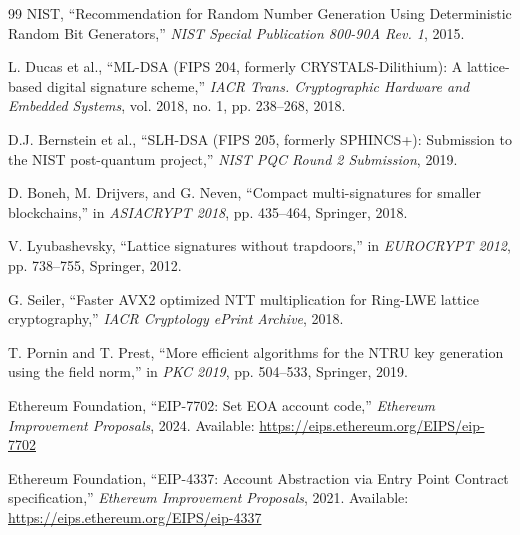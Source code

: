 \begin{thebibliography}{99}
NIST,
``Recommendation for Random Number Generation Using Deterministic Random Bit Generators,''
\textit{NIST Special Publication 800-90A Rev. 1}, 2015.

L. Ducas et al.,
``ML-DSA (FIPS 204, formerly CRYSTALS-Dilithium): A lattice-based digital signature scheme,''
\textit{IACR Trans. Cryptographic Hardware and Embedded Systems}, vol. 2018, no. 1, pp. 238--268, 2018.

D.J. Bernstein et al.,
``SLH-DSA (FIPS 205, formerly SPHINCS+): Submission to the NIST post-quantum project,''
\textit{NIST PQC Round 2 Submission}, 2019.

D. Boneh, M. Drijvers, and G. Neven,
``Compact multi-signatures for smaller blockchains,''
in \textit{ASIACRYPT 2018}, pp. 435--464, Springer, 2018.

V. Lyubashevsky,
``Lattice signatures without trapdoors,''
in \textit{EUROCRYPT 2012}, pp. 738--755, Springer, 2012.

G. Seiler,
``Faster AVX2 optimized NTT multiplication for Ring-LWE lattice cryptography,''
\textit{IACR Cryptology ePrint Archive}, 2018.

T. Pornin and T. Prest,
``More efficient algorithms for the NTRU key generation using the field norm,''
in \textit{PKC 2019}, pp. 504--533, Springer, 2019.

Ethereum Foundation,
``EIP-7702: Set EOA account code,''
\textit{Ethereum Improvement Proposals}, 2024.
Available: \url{https://eips.ethereum.org/EIPS/eip-7702}

Ethereum Foundation,
``EIP-4337: Account Abstraction via Entry Point Contract specification,''
\textit{Ethereum Improvement Proposals}, 2021.
Available: \url{https://eips.ethereum.org/EIPS/eip-4337}

\end{thebibliography}

